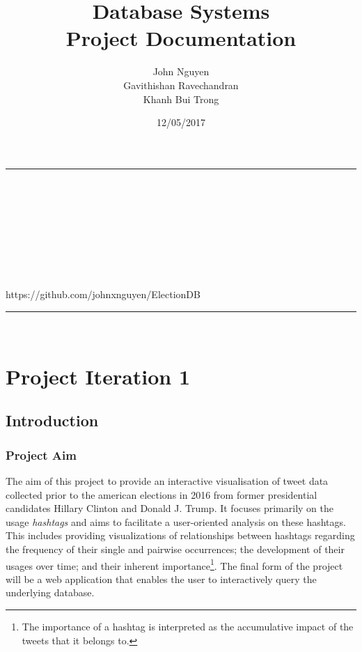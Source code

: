 \documentclass[a4paper, 12pt]{report}
\makeatletter
\newcommand{\LINE}{\rule{\linewidth}{0.5pt}}
\renewcommand{\maketitle}{
\vspace*{20pt}
\LINE\\
\vspace{2pt}\\
{\huge \noindent\sffamily{\@title}}\\
\vspace{2pt}\\
\hfill {\large \@date}\\
\vspace{2pt}\\
{\large \@author}\\
\vspace{2pt}\\
https://github.com/johnxnguyen/ElectionDB\\
\LINE\\
\vspace{4pt}
}
\makeatother
\begin{document}
\title{\textbf{Database Systems}\\Project Documentation}
\date{12/05/2017}
\author{John Nguyen\\Gavithishan Ravechandran\\Khanh Bui Trong}
\maketitle
\thispagestyle{empty}


\chapter{Project Iteration 1}
\label{ch:iteration1}

\newpage
\section{Introduction}
\subsection{Project Aim}
The aim of this project to provide an interactive visualisation of tweet data collected prior to the american elections in 2016 from former presidential candidates Hillary Clinton and Donald J. Trump. It focuses primarily on the usage \emph{hashtags} and aims to facilitate a user-oriented analysis on these hashtags. This includes providing visualizations of relationships between hashtags regarding the frequency of their single and pairwise occurrences; the development of their usages over time; and their inherent importance\footnote{The importance of a hashtag is interpreted as the accumulative impact of the tweets that it belongs to.}. The final form of the project will be a web application that enables the user to interactively query the underlying database.
\end{document}
